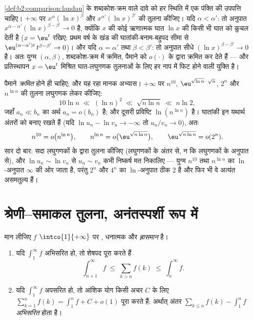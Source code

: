 \begin{example}[मानक पैमाना सचमुच क्रमित है]\label{ex:b2:comparison:scaleorder}
\cref{def:b2:comparison:landau} के शब्दकोश-क्रम वाले दावे को हर स्थिति में एक पंक्ति की उपपत्ति
चाहिए। $+\infty$ पर $x^{\alpha}(\ln x)^{\beta}$ और $x^{\alpha'}(\ln x)^{\beta'}$ की तुलना कीजिए। यदि $\alpha < \alpha'$: तो अनुपात $x^{\alpha - \alpha'}(\ln x)^{\beta - \beta'} \to 0$ है,
क्योंकि $x$ की कोई ऋणात्मक घात $\ln x$ की किसी भी घात को कुचल देती है ($x =
\eu^t$
रखिए: प्रथम वर्ष के खंड की घातांकी-बनाम-बहुपद सीमा से $\eu^{(\alpha - \alpha')t}\,t^{\beta - \beta'} \to 0$)। और यदि $\alpha = \alpha'$
तथा $\beta < \beta'$: तो अनुपात सीधे $(\ln x)^{\beta - \beta'} \to 0$ है। अतः युग्म $(\alpha, \beta)$, शब्दकोश-क्रम में
क्रमित, पैमाने को $o(\cdot)$ के द्वारा क्रमित कर देते हैं --- और प्रतिस्थापन
$x = \eu^t$ मिश्रित घात-लघुगणक तुलनाओं के लिए हर नाप में फिट होने वाली युक्ति
है।
\end{example}

\begin{example}[एक चिड़ियाघर की क्रम-सूची]\label{ex:b2:comparison:ranking}
पैमाने \emph{क्रमित} होने ही चाहिए; और यह रहा मानक अभ्यास। $+\infty$ पर $n^{10}$,
$\eu^{\sqrt{\ln n}\,\cdot\,\sqrt n}$, $2^n$ और $n^{\ln n}$ की तुलना लघुगणक लेकर कीजिए:
\[
10\ln n
\;\ll\; (\ln n)^2
\;\ll\; \sqrt{n\ln n}
\;\ll\; n\ln 2 ,
\]
जहाँ $a_n \ll b_n$ का अर्थ $a_n = o(b_n)$ है; और दूसरी प्रविष्टि $\ln(n^{\ln n})$ है। घातांकी इन यथार्थ
अंतरों को बनाए रखते हैं (यदि $\ln u_n - \ln v_n \to -\infty$ तो $u_n/v_n \to 0$), अतः
\[
n^{10} = o\bigl(n^{\ln n}\bigr),
\qquad
n^{\ln n} = o\bigl(\eu^{\sqrt{n\ln n}}\bigr),
\qquad
\eu^{\sqrt{n\ln n}} = o(2^n) .
\]
सार दो बार: सदा लघुगणकों के द्वारा तुलना कीजिए (लघुगणकों के अंतर से, न
कि लघुगणकों के अनुपात से), और $\ln u_n \sim \ln v_n$ से $u_n \sim v_n$ कभी निष्कर्ष मत निकालिए ---
युग्म $n^{10}$ तथा $n^{\ln n}$ का $\ln$-अनुपात $\infty$ की ओर जाता है, परंतु $2^n$ और
$4^n$ का $\ln$-अनुपात ठीक $2$ है और फिर भी वे अत्यंत असमतुल्य हैं।
\end{example}

\section{श्रेणी--समाकल तुलना, अनंतस्पर्शी रूप में}

\begin{theorem}\label{thm:b2:comparison:seriesintegral}
मान लीजिए $f$ $\intco{1}{+\infty}$ पर , धनात्मक और \emph{ह्रासमान} है।
\begin{enumerate}
  \item यदि $\int_1^{\infty} f$ अभिसरित हो, तो शेषपद पूरा करते हैं
        \[
        \int_{n+1}^{\infty} f \;\leq\; \sum_{k > n} f(k) \;\leq\;
        \int_{n}^{\infty} f .
        \]
  \item यदि $\int_1^\infty f$ अपसरित हो, तो आंशिक योग किसी अचर $C$ के लिए $\sum_{k=1}^{n} f(k) = \int_1^n f + C + o(1)$ पूरा
        करते हैं: अर्थात् अंतर $\sum_{k \leq n} f(k) -
        \int_1^n f$ \emph{अभिसरित} होता है।
\end{enumerate}
\end{theorem}

